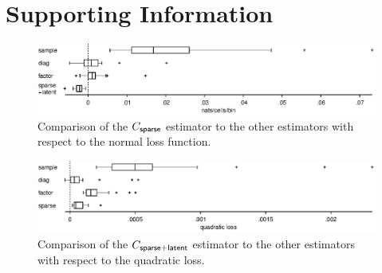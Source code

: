 \documentclass[10pt]{article}
\begin{document}
\newpage
\section*{Supporting Information}
\setcounter{figure}{0}
\renewcommand{\figurename}{Figure S}

\begin{figure}[!ht]
\begin{center}
\includegraphics{./figures/src/Supp1.eps}
\end{center}
\caption{Comparison of the $C_{\sf sparse}$ estimator to the other estimators with respect to the normal loss function.}
\label{supp:01}
\end{figure}


\begin{figure}[!ht]
\begin{center}
\includegraphics{./figures/src/Supp2.eps}
\end{center}
\caption{Comparison of the $C_{\sf sparse+latent}$ estimator to the other estimators with respect to the quadratic loss.}
\label{supp:02}
\end{figure}
\end{document}
